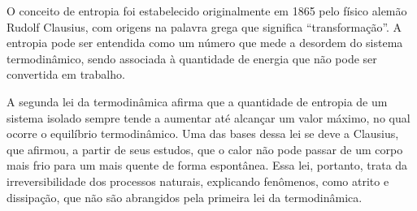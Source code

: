 \documentclass[Tese.tex]{subfiles}
\begin{document}
O conceito de entropia foi estabelecido originalmente em 1865 pelo físico alemão Rudolf Clausius, com origens na palavra grega que significa ``transformação''. A entropia pode ser entendida como um número que mede a desordem do sistema termodinâmico, sendo associada à quantidade de energia que não pode ser convertida em trabalho.

A segunda lei da termodinâmica afirma que a quantidade de entropia de um sistema isolado sempre tende a aumentar até alcançar um valor máximo, no qual ocorre o equilíbrio termodinâmico. Uma das bases dessa lei se deve a Clausius, que afirmou, a partir de seus estudos, que o calor não pode passar de um corpo mais frio para um mais quente de forma espontânea. Essa lei, portanto, trata da irreversibilidade dos processos naturais, explicando fenômenos, como atrito e dissipação, que não são abrangidos pela primeira lei da termodinâmica.
\end{document}
